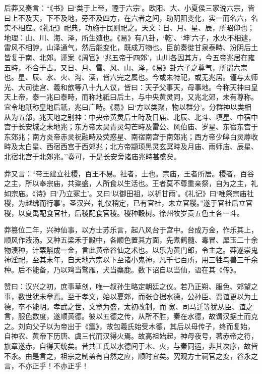 \documentclass[]{article}
\begin{document}
后莽又奏言：``《书》曰`类于上帝，禋于六宗'。欧阳、大、小夏侯三家说六宗，皆曰上不及天，下不及地，旁不及四方，在六者之间，助阴阳变化，实一而名六，名实不相应。《礼记》祀典，功施于民则祀之。天文：日、月、星、辰，所昭仰也；地理：山、川、海、泽，所生殖也。《易》有八卦，`乾'、`坤'六子，水火不相逮，雷风不相誖，山泽通气，然后能变化，既成万物也。臣前奏徙甘泉泰畤、汾阴后土皆复于南、北郊。谨案《周官》`兆五帝于四郊'，山川各因其方，今五帝兆居在雍五畤，不合于古。又日、月、雷、风、山、泽，《易》卦六子之尊气，所谓六宗也。星、辰、水、火、沟、渎，皆六完之属也。今或未特祀，或无兆居。谨与太师光、大司徒宫、羲和歆等八十九人议，皆曰：天子父事天，母事地。今称天神曰皇天上帝，泰一兆曰泰畤，而称地祇曰后土，与中央黄灵同，又兆北郊，未有尊称。宜令地祇称皇地后祇，兆曰广畤。《易》曰`方以类聚，物以群分'。分群神以类相从为五部，兆天地之别神：中央帝黄灵后土畤及日庙、北辰、北斗、填星、中宿中宫于长安城之未地兆；东方帝太昊青灵勾芒畤及雷公、风伯庙、岁星、东宿东宫于东郊兆；南方炎帝赤灵祝融畤及荧惑星、南宿南宫于南郊兆；西方帝少皞白灵蓐收畤及太白星、西宿西宫于西郊兆；北方帝颛顼黑灵玄冥畤及月庙、雨师庙、辰星、北宿北宫于北郊兆。''奏可，于是长安旁诸庙兆畤甚盛矣。

莽又言：``帝王建立社稷，百王不易。社者，土也。宗庙，王者所居。稷者，百谷之主，所以奉宗庙，共粢盛，人所食以生活也。王者莫不尊重亲祭，自为之主，礼如宗庙。《诗》曰`乃立冢土'。又曰`以御田祖，以祈甘雨'。《礼记》曰`唯祭宗庙社稷，为越绋而行事'。圣汉兴，礼仪稍定，已有官社，未立官稷。''遂于官社后立官稷，以夏禹配食官社，后稷配食官稷。稷种穀树。徐州牧岁贡五色土各一斗。

莽篡位二年，兴神仙事，以方士苏乐言，起八风台于宫中。台成万金，作乐其上，顺风作液汤。又种五梁禾于殿中，各顺色置其方面，先煮鹤髓、毒冒、犀玉二十余物渍种，计粟斛成一金，言此黄帝谷仙之术也。以乐为黄门郎，令主之。莽遂崇鬼神淫祀，至其末年，自天地六宗以下至诸小鬼神，凡千七百所，用三牲鸟兽三千余种。后不能备，乃以鸡当鹜雁，犬当麋鹿。数下诏自以当仙，语在其《传》。

赞曰：汉兴之初，庶事草创，唯一叔孙生略定朝廷之仪。若乃正朔、服色、郊望之事，数世犹未章焉。至于孝文，始以夏郊，而张仓据水德，公孙臣、贾谊更以为土德，卒不能明。孝武之世，文章为盛，太初改制，而宽、司马迁等犹从臣、谊之言，服色数度，遂顺黄德。彼以五德之传，从所不胜，秦在水德，故谓汉据土而克之。刘向父子以为帝出于《震》，故包羲氏始受木德，其后以母传子，终而复始，自神农、黄帝下历唐、虞三代而汉得火焉。故高祖始起，神母夜号，著赤帝之符，旗章遂赤，自得天统矣。昔共工氏以水德间于木、火，与秦同运，非其次序，故皆不永。由是言之，祖宗之制盖有自然之应，顺时宜矣。究观方士祠官之变，谷永之言，不亦正乎！不亦正乎！
\end{document}
